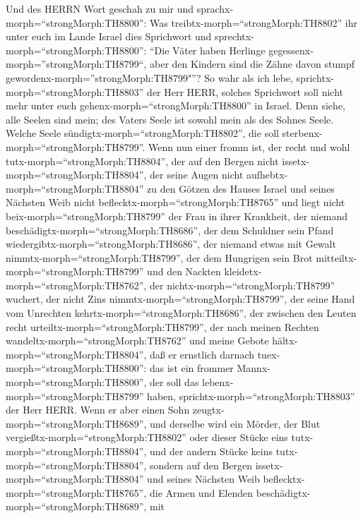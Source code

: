  Und des HERRN Wort geschah zu mir und
sprachx-morph=``strongMorph:TH8800'':  Was
treibtx-morph=``strongMorph:TH8802'' ihr unter euch im Lande Israel dies
Sprichwort und sprechtx-morph=``strongMorph:TH8800'': ``Die Väter haben
Herlinge gegessenx-morph=''strongMorph:TH8799``, aber den Kindern sind
die Zähne davon stumpf gewordenx-morph=''strongMorph:TH8799"''?
 So wahr als ich lebe, sprichtx-morph=``strongMorph:TH8803''
der Herr HERR, solches Sprichwort soll nicht mehr unter euch
gehenx-morph=``strongMorph:TH8800'' in Israel.  Denn siehe,
alle Seelen sind mein; des Vaters Seele ist sowohl mein als des Sohnes
Seele. Welche Seele sündigtx-morph=``strongMorph:TH8802'', die soll
sterbenx-morph=``strongMorph:TH8799''.  Wenn nun einer fromm
ist, der recht und wohl tutx-morph=``strongMorph:TH8804'', 
der auf den Bergen nicht issetx-morph=``strongMorph:TH8804'', der seine
Augen nicht aufhebtx-morph=``strongMorph:TH8804'' zu den Götzen des
Hauses Israel und seines Nächsten Weib nicht
beflecktx-morph=``strongMorph:TH8765'' und liegt nicht
beix-morph=``strongMorph:TH8799'' der Frau in ihrer Krankheit,
 der niemand beschädigtx-morph=``strongMorph:TH8686'', der
dem Schuldner sein Pfand wiedergibtx-morph=``strongMorph:TH8686'', der
niemand etwas mit Gewalt nimmtx-morph=``strongMorph:TH8799'', der dem
Hungrigen sein Brot mitteiltx-morph=``strongMorph:TH8799'' und den
Nackten kleidetx-morph=``strongMorph:TH8762'',  der
nichtx-morph=``strongMorph:TH8799'' wuchert, der nicht Zins
nimmtx-morph=``strongMorph:TH8799'', der seine Hand vom Unrechten
kehrtx-morph=``strongMorph:TH8686'', der zwischen den Leuten recht
urteiltx-morph=``strongMorph:TH8799'',  der nach meinen
Rechten wandeltx-morph=``strongMorph:TH8762'' und meine Gebote
hältx-morph=``strongMorph:TH8804'', daß er ernstlich darnach
tuex-morph=``strongMorph:TH8800'': das ist ein frommer
Mannx-morph=``strongMorph:TH8800'', der soll das
lebenx-morph=``strongMorph:TH8799'' haben,
sprichtx-morph=``strongMorph:TH8803'' der Herr HERR.  Wenn
er aber einen Sohn zeugtx-morph=``strongMorph:TH8689'', und derselbe
wird ein Mörder, der Blut vergießtx-morph=``strongMorph:TH8802'' oder
dieser Stücke eins tutx-morph=``strongMorph:TH8804'',  und
der andern Stücke keins tutx-morph=``strongMorph:TH8804'', sondern auf
den Bergen issetx-morph=``strongMorph:TH8804'' und seines Nächsten Weib
beflecktx-morph=``strongMorph:TH8765'',  die Armen und
Elenden beschädigtx-morph=``strongMorph:TH8689'', mit
